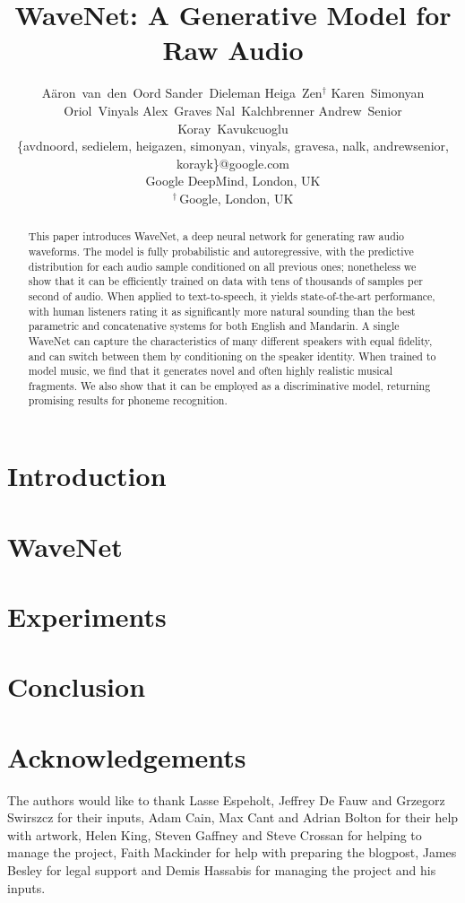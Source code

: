 \documentclass{article}
\title{
WaveNet: A Generative Model for Raw Audio
}
\author{A\"{a}ron~van~den~Oord \And
\hspace{-0.5cm}Sander~Dieleman \And
Heiga~Zen$^\dagger$ \AND
Karen~Simonyan \And
Oriol~Vinyals \And
Alex~Graves \AND
Nal~Kalchbrenner \And
\hspace{1cm}Andrew~Senior \And
Koray~Kavukcuoglu \AND \\
\{avdnoord, sedielem, heigazen, simonyan, vinyals, gravesa, nalk, andrewsenior, korayk\}@google.com\\
Google DeepMind, London, UK \\ 
$^\dagger$\,Google, London, UK
}
\begin{document}
 


\maketitle


\vskip 0.3in

\begin{abstract}
This paper introduces WaveNet, a deep neural network for generating raw audio waveforms. The model is fully probabilistic and autoregressive, with the predictive distribution for each audio sample conditioned on all previous ones; nonetheless we show that it can be efficiently trained on data with tens of thousands of samples per second of audio. 
When applied to text-to-speech, it yields state-of-the-art performance, with human listeners rating it as significantly more natural sounding than the best parametric and concatenative systems for both English and Mandarin. A single WaveNet can capture the characteristics of many different speakers with equal fidelity, and can switch between them by conditioning on the speaker identity. When trained to model music, we find that it generates novel and often highly realistic musical fragments. We also show that it can be employed as a discriminative model, returning promising results for phoneme recognition.
\end{abstract} 


\section{Introduction}



\section{WaveNet}
\label{sec:wavenet}


\section{Experiments}



\section{Conclusion}


\section*{Acknowledgements} 
The authors would like to thank Lasse Espeholt, Jeffrey De Fauw and Grzegorz Swirszcz for their inputs, Adam Cain, Max Cant and Adrian Bolton for their help with artwork, Helen King, Steven Gaffney and Steve Crossan for helping to manage the project, Faith Mackinder for help  with preparing the blogpost, James Besley for legal support and Demis Hassabis for managing the project and his inputs.


\end{document}
